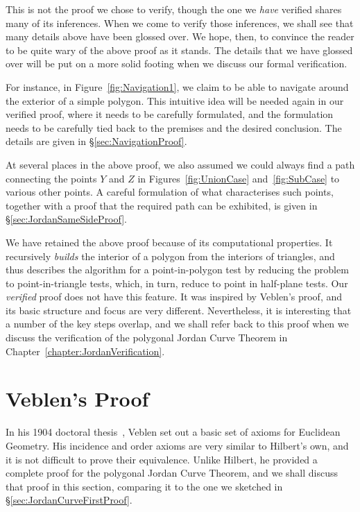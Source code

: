 This is not the proof we chose to verify, though the one we \emph{have} verified shares many of its inferences. When we come to verify those inferences, we shall see that many details above have been glossed over. We hope, then, to convince the reader to be quite wary of the above proof as it stands. The details that we have glossed over will be put on a more solid footing when we discuss our formal verification.

\label{sec:Jordan1NavigationDiscussion}For instance, in Figure~\ref{fig:Navigation1}, we claim to be able to navigate around the exterior of a simple polygon. This intuitive idea will be needed again in our verified proof, where it needs to be carefully formulated, and the formulation needs to be carefully tied back to the premises and the desired conclusion. The details are given in \S\ref{sec:NavigationProof}.

\label{sec:Jordan1SameSideDiscussion}At several places in the above proof, we also assumed we could always find a path connecting the points $Y$ and $Z$ in Figures~\ref{fig:UnionCase} and~\ref{fig:SubCase} to various other points. A careful formulation of what characterises such points, together with a proof that the required path can be exhibited, is given in \S\ref{sec:JordanSameSideProof}.

We have retained the above proof because of its computational properties. It recursively \emph{builds} the interior of a polygon from the interiors of triangles, and thus describes the algorithm for a point-in-polygon test by reducing the problem to point-in-triangle tests, which, in turn, reduce to point in half-plane tests. Our \emph{verified} proof does not have this feature. It was inspired by Veblen's proof, and its basic structure and focus are very different. Nevertheless, it is interesting that a number of the key steps overlap, and we shall refer back to this proof when we discuss the verification of the polygonal Jordan Curve Theorem in Chapter~\ref{chapter:JordanVerification}.

\section{Veblen's Proof}\label{sec:VeblenProof}
In his 1904 doctoral thesis~\cite{Veblenphd}, Veblen set out a basic set of axioms for Euclidean Geometry. His incidence and order axioms are very similar to Hilbert's own, and it is not difficult to prove their equivalence. Unlike Hilbert, he provided a complete proof for the polygonal Jordan Curve Theorem, and we shall discuss that proof in this section, comparing it to the one we sketched in \S\ref{sec:JordanCurveFirstProof}.

